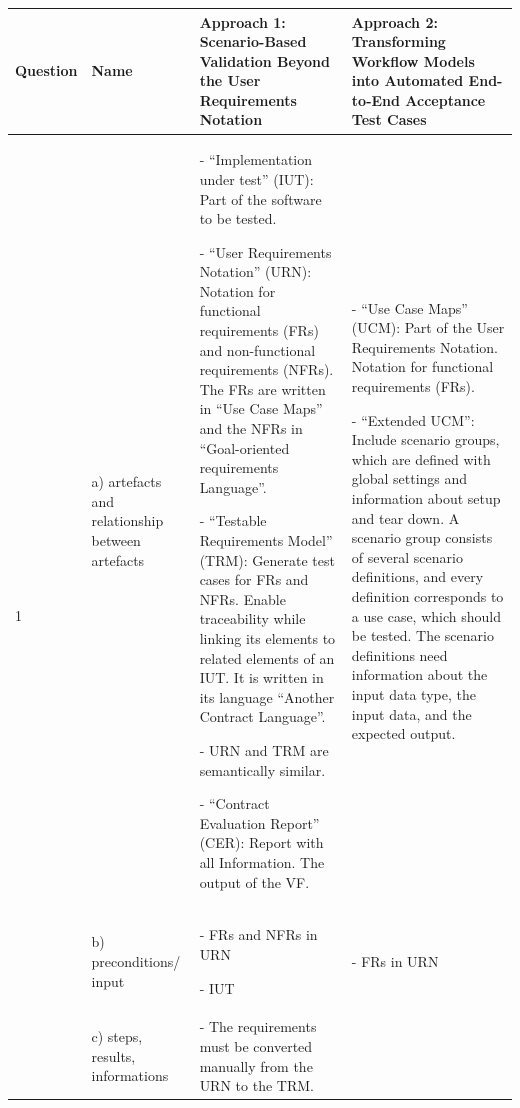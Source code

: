 \newpage
{}
\begin{landscape}
	\begin{small}
	\begin{table}
		\caption{Synthesis Matrix part 1/2.}
		\begin{longtable}[h]{p{1.3cm}|>{\raggedright}p{2.8cm}|>{}p{9.1cm}|>{}p{9.1cm}}
			\hline
			\textbf{Question} 
			& \textbf{Name} 
			& \textbf{Approach 1: Scenario-Based Validation Beyond the User Requirements Notation} 
			& \textbf{Approach 2: Transforming Workflow Models into Automated End-to-End Acceptance Test Cases}\\ \hline
			\multirow{3}{*}{1 \rotatebox[origin=r]{90}{\textbf{Description}}} 
			& a) artefacts and relationship between artefacts 
			&- \enquote{Implementation under test} (IUT): Part of the software to be tested. 
			
			- \enquote{User Requirements Notation} (URN): Notation for functional requirements (FRs) and non-functional requirements (NFRs). The FRs are written in \enquote{Use Case Maps} and the NFRs in \enquote{Goal-oriented requirements Language}.
			
			- \enquote{Testable Requirements Model} (TRM): Generate test cases for FRs and NFRs. Enable traceability while linking its elements to related elements of an IUT. It is written in its language \enquote{Another Contract Language}. 
			
			- URN and TRM are semantically similar.
			
			- \enquote{Contract Evaluation Report} (CER): Report with all Information. The output of the VF.
			&- \enquote{Use Case Maps} (UCM): Part of the User Requirements Notation. Notation for functional requirements (FRs).
			
			- \enquote{Extended UCM}: Include scenario groups, which are defined with global settings and information about setup and tear down. A scenario group consists of several scenario definitions, and every definition corresponds to a use case, which should be tested. The scenario definitions need information about the input data type, the input data, and the expected output.
			\\
			\cline{2-4}
			& b) preconditions/ input 
			&  - FRs and NFRs in URN
			
			- IUT
			& 
			- FRs in URN \\
			\cline{2-4}
			& c) steps, results, informations 
			& - The requirements must be converted manually from the URN to the TRM.
			

\end{longtable}
\end{table}
\end{small}
\end{landscape}
